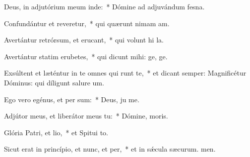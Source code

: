 \item Deus, in adjutórium meum inde:~* Dómine ad adjuvándum  fesna.
\item Confundántur et reveretur,~* qui quærunt nimam am.
\item Avertántur retrórsum, et erucant,~* qui volunt hi la.
\item Avertántur statim erubetes,~* qui dicunt mihi: ge, ge.
\item Exsúltent et læténtur in te omnes qui runt te,~* et dicant semper: Magnificétur Dóminus: qui díligunt salure um.
\item Ego vero egénus, et per sum:~* Deus, ju me.
\item Adjútor meus, et liberátor meus  tu:~* Dómine,  moris.
\item Glória Patri, et lio,~* et Spitui to.
\item Sicut erat in princípio, et nunc, et per,~* et in sǽcula sæcurum. men.
